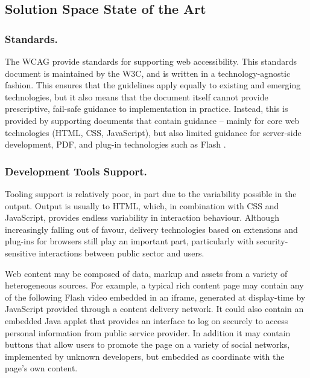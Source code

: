 
\subsection{Solution Space State of the Art} %
\label{sub:state_of_the_art}

\subsubsection{Standards.} %
	\label{ssub:standards_}
	The \ac{WCAG} \cite{wcag:2008} provide standards for supporting web accessibility. This standards document is maintained by the \ac{W3C}, and is written in a technology-agnostic fashion. This ensures that the guidelines apply equally to existing and emerging technologies, but it also means that the document itself cannot provide prescriptive, fail-safe guidance to implementation in practice. Instead, this is provided by supporting documents that contain guidance -- mainly for core web technologies (HTML, CSS, JavaScript), but also limited guidance for server-side development, PDF, and plug-in technologies such as Flash \cite{wcagtechs:2012}.

\subsubsection{Development Tools Support.} %
	\label{ssub:development_tools_support_}
	Tooling support is relatively poor, in part due to the variability possible in the output. Output is usually to HTML, which, in combination with CSS and JavaScript, provides endless variability in interaction behaviour. Although increasingly falling out of favour, delivery technologies based on extensions and plug-ins for browsers still play an important part, particularly with security-sensitive interactions between public sector and users.

	Web content may be composed of data, markup and assets from a variety of heterogeneous sources. For example, a typical rich content page may contain any of the following Flash video embedded in an iframe, generated at display-time by JavaScript provided through a content delivery network. It could also contain an embedded Java applet that provides an interface to log on securely to access personal information from public service provider. In addition it may contain buttons that allow users to promote the page on a variety of social networks, implemented by unknown developers, but embedded as coordinate with the page's own content.

